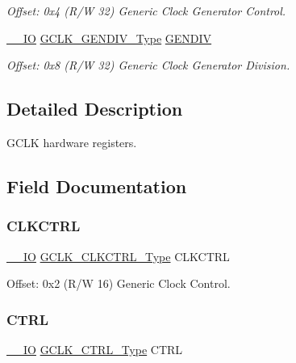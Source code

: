 \begin{DoxyCompactItemize}
\begin{DoxyCompactList}\small\item\em Offset\+: 0x4 (R/W 32) Generic Clock Generator Control. \end{DoxyCompactList}\item 
\mbox{\hyperlink{core__cm0plus_8h_aec43007d9998a0a0e01faede4133d6be}{\+\_\+\+\_\+\+IO}} \mbox{\hyperlink{union_g_c_l_k___g_e_n_d_i_v___type}{G\+C\+L\+K\+\_\+\+G\+E\+N\+D\+I\+V\+\_\+\+Type}} \mbox{\hyperlink{struct_gclk_aa48268a120aa8b1327323004b3248bdc}{G\+E\+N\+D\+IV}}
\begin{DoxyCompactList}\small\item\em Offset\+: 0x8 (R/W 32) Generic Clock Generator Division. \end{DoxyCompactList}\end{DoxyCompactItemize}


\subsection{Detailed Description}
G\+C\+LK hardware registers. 

\subsection{Field Documentation}
\mbox{\label{struct_gclk_a63c060e40f0f959a293301c86eea0d31}} 
\subsubsection{\texorpdfstring{CLKCTRL}{CLKCTRL}}
{\footnotesize\ttfamily \mbox{\hyperlink{core__cm0plus_8h_aec43007d9998a0a0e01faede4133d6be}{\+\_\+\+\_\+\+IO}} \mbox{\hyperlink{union_g_c_l_k___c_l_k_c_t_r_l___type}{G\+C\+L\+K\+\_\+\+C\+L\+K\+C\+T\+R\+L\+\_\+\+Type}} C\+L\+K\+C\+T\+RL}



Offset\+: 0x2 (R/W 16) Generic Clock Control. 

\mbox{\label{struct_gclk_a6625eefafb87e98956f3ef6e9b3470b9}} 
\subsubsection{\texorpdfstring{CTRL}{CTRL}}
{\footnotesize\ttfamily \mbox{\hyperlink{core__cm0plus_8h_aec43007d9998a0a0e01faede4133d6be}{\+\_\+\+\_\+\+IO}} \mbox{\hyperlink{union_g_c_l_k___c_t_r_l___type}{G\+C\+L\+K\+\_\+\+C\+T\+R\+L\+\_\+\+Type}} C\+T\+RL}



